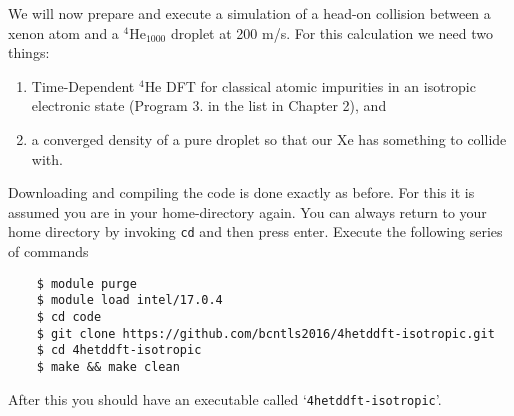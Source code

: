 \documentclass[10pt,a4paper]{article}
\begin{document}
	We will now prepare and execute a simulation of a head-on collision between a xenon atom and a $^4$He$_{1000}$ droplet at 200 m/s. For this calculation we need two things:
	\begin{enumerate}
		\item Time-Dependent $^4$He DFT for classical atomic impurities in an isotropic electronic state (Program 3. in the list in Chapter 2), and
		\item a converged density of a pure droplet so that our Xe has something to collide with. 
	\end{enumerate}
	Downloading and compiling the code is done exactly as before. For this it is assumed you are in your home-directory again. You can always return to your home directory by invoking \verb|cd| and then press enter. Execute the following series of commands
	\begin{verbatim}
	$ module purge
	$ module load intel/17.0.4
	$ cd code
	$ git clone https://github.com/bcntls2016/4hetddft-isotropic.git
	$ cd 4hetddft-isotropic
	$ make && make clean
	\end{verbatim}
	After this you should have an executable called `\verb|4hetddft-isotropic|'. 
	
\end{document}
